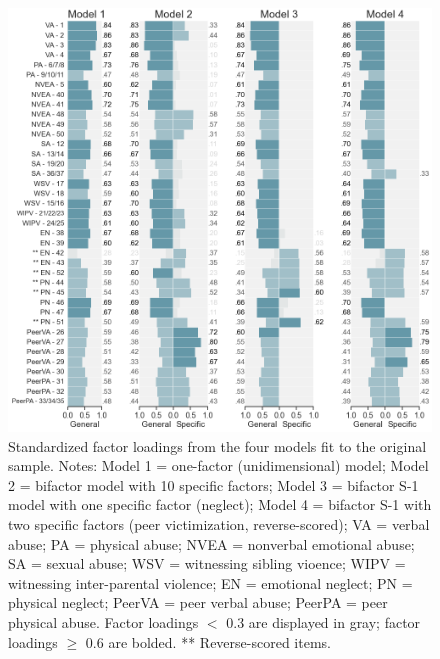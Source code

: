 \documentclass[letterpaper,man,natbib,longtable,floatsintext,12pt]{apa6}
\begin{document}
\begin{figure}[tp]
    \centering
    \includegraphics[width=1.1\textwidth,center]{figures/fig02.png}
    \captionsetup{width=1.1\textwidth}
    \caption{Standardized factor loadings from the four models fit to the original sample. Notes: Model 1 = one-factor (unidimensional) model; Model 2 = bifactor model with 10 specific factors; Model 3 = bifactor S-1 model with one specific factor (neglect); Model 4 = bifactor S-1 with two specific factors (peer victimization, reverse-scored); VA = verbal abuse; PA = physical abuse; NVEA = nonverbal emotional abuse; SA = sexual abuse; WSV = witnessing sibling vioence; WIPV = witnessing inter-parental violence; EN = emotional neglect; PN = physical neglect; PeerVA = peer verbal abuse; PeerPA = peer physical abuse. Factor loadings $<$ 0.3 are displayed in gray; factor loadings $\geq$ 0.6 are bolded.  ** Reverse-scored items.}
    \label{fig:loadings_original}
\end{figure}
\end{document}

